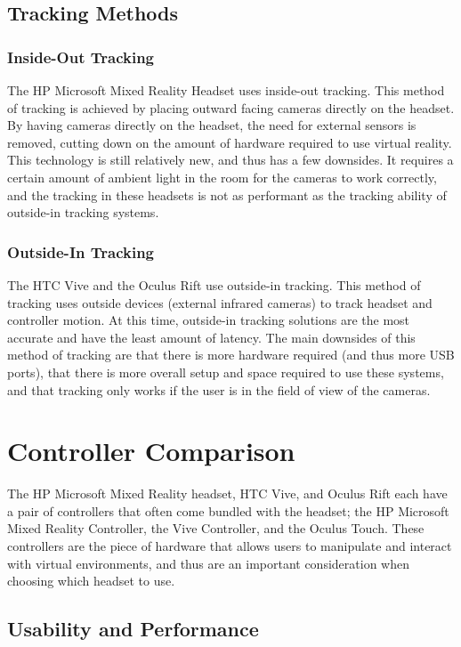 \documentclass[onecolumn, draftclsnofoot,10pt, compsoc]{IEEEtran}
\begin{document}
\subsection{Tracking Methods}

\subsubsection{Inside-Out Tracking}
The HP Microsoft Mixed Reality Headset uses inside-out tracking. This method of tracking is achieved by placing outward facing cameras directly on the headset. By having cameras directly on the headset, the need for external sensors is removed, cutting down on the amount of hardware required to use virtual reality. This technology is still relatively new, and thus has a few downsides. It requires a certain amount of ambient light in the room for the cameras to work correctly, and the tracking in these headsets is not as performant as the tracking ability of outside-in tracking systems. 

\subsubsection{Outside-In Tracking}
The HTC Vive and the Oculus Rift use outside-in tracking. This method of tracking uses outside devices (external infrared cameras) to track headset and controller motion. At this time, outside-in tracking solutions are the most accurate and have the least amount of latency. The main downsides of this method of tracking are that there is more hardware required (and thus more USB ports), that there is more overall setup and space required to use these systems, and that tracking only works if the user is in the field of view of the cameras.  


\section{Controller Comparison}
The HP Microsoft Mixed Reality headset, HTC Vive, and Oculus Rift each have a pair of controllers that often come bundled with the headset; the HP Microsoft Mixed Reality Controller, the Vive Controller, and the Oculus Touch. These controllers are the piece of hardware that allows users to manipulate and interact with virtual environments, and thus are an important consideration when choosing which headset to use. 

\subsection{Usability and Performance}
\end{document}
